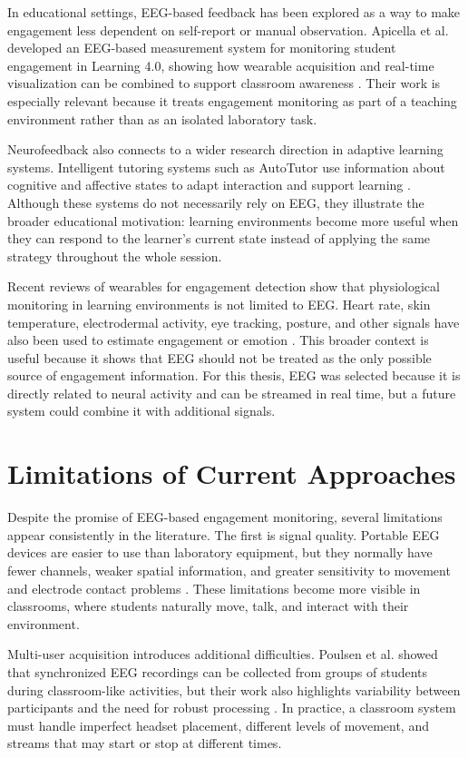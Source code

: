 In educational settings, EEG-based feedback has been explored as a way to make engagement less dependent on self-report or manual observation. Apicella et al. developed an EEG-based measurement system for monitoring student engagement in Learning 4.0, showing how wearable acquisition and real-time visualization can be combined to support classroom awareness \cite{Apicella2022}. Their work is especially relevant because it treats engagement monitoring as part of a teaching environment rather than as an isolated laboratory task.


Neurofeedback also connects to a wider research direction in adaptive learning systems. Intelligent tutoring systems such as AutoTutor use information about cognitive and affective states to adapt interaction and support learning \cite{DMello2013}. Although these systems do not necessarily rely on EEG, they illustrate the broader educational motivation: learning environments become more useful when they can respond to the learner's current state instead of applying the same strategy throughout the whole session.


Recent reviews of wearables for engagement detection show that physiological monitoring in learning environments is not limited to EEG. Heart rate, skin temperature, electrodermal activity, eye tracking, posture, and other signals have also been used to estimate engagement or emotion \cite{BustosLopez2022}. This broader context is useful because it shows that EEG should not be treated as the only possible source of engagement information. For this thesis, EEG was selected because it is directly related to neural activity and can be streamed in real time, but a future system could combine it with additional signals.

\section{Limitations of Current Approaches}\label{sect:limcurrapp}
Despite the promise of EEG-based engagement monitoring, several limitations appear consistently in the literature. The first is signal quality. Portable EEG devices are easier to use than laboratory equipment, but they normally have fewer channels, weaker spatial information, and greater sensitivity to movement and electrode contact problems \cite{Xu2018}. These limitations become more visible in classrooms, where students naturally move, talk, and interact with their environment.


Multi-user acquisition introduces additional difficulties. Poulsen et al. showed that synchronized EEG recordings can be collected from groups of students during classroom-like activities, but their work also highlights variability between participants and the need for robust processing \cite{Poulsen2017}. In practice, a classroom system must handle imperfect headset placement, different levels of movement, and streams that may start or stop at different times.


